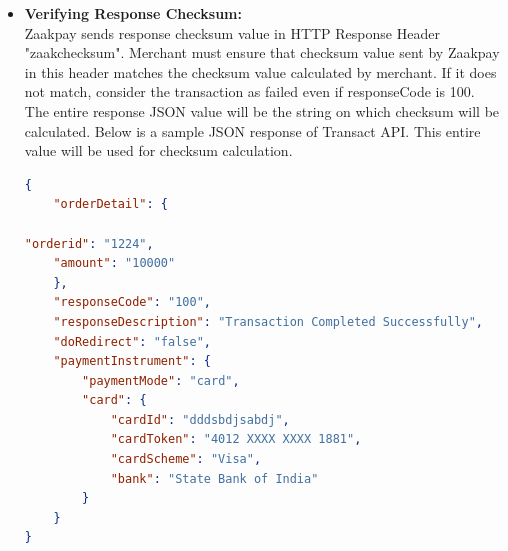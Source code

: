 \documentclass{article}
\begin{document}
\begin{itemize}
\begin{itemize}
\end{itemize}
\item {\bfseries Verifying Response Checksum:} \\ Zaakpay   sends   response   checksum   value   in   HTTP   Response   Header  "zaakchecksum".   Merchant   must   ensure that   checksum   value   sent   by   Zaakpay   in   this   header   matches   the   checksum   value   calculated   by   merchant. If   it  does not match, consider the transaction as failed even if responseCode is 100. \\ 
The   entire   response   JSON   value   will   be   the   string   on   which   checksum   will   be   calculated.   Below   is   a   sample   JSON response of Transact API. This entire value will be used for checksum calculation.
\begin{lstlisting}[language=json,breaklines=true]
{ 
    "orderDetail": { 
 
"orderid": "1224", 
    "amount": "10000" 
    }, 
    "responseCode": "100", 
    "responseDescription": "Transaction Completed Successfully", 
    "doRedirect": "false", 
    "paymentInstrument": { 
        "paymentMode": "card", 
        "card": { 
            "cardId": "dddsbdjsabdj", 
            "cardToken": "4012 XXXX XXXX 1881", 
            "cardScheme": "Visa", 
            "bank": "State Bank of India" 
        } 
    } 
}   
\end{lstlisting}
\end{itemize}
\newpage
\end{document}
